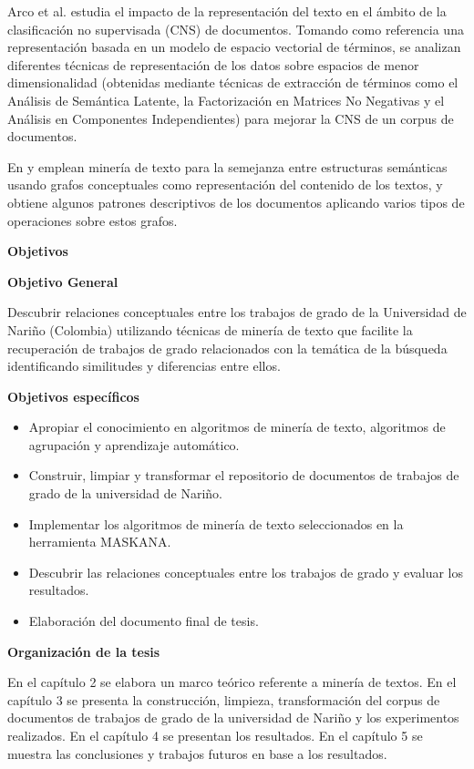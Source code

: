 Arco et al.\cite{arco2006agrupamiento} estudia el impacto de la representación del texto en el ámbito de la clasificación no supervisada (CNS) de documentos.
Tomando como referencia una representación basada en un modelo de espacio vectorial de términos, se analizan diferentes
técnicas de representación de los datos sobre espacios de menor dimensionalidad (obtenidas mediante técnicas de extracción de
términos como el Análisis de Semántica Latente, la Factorización en Matrices No Negativas y el Análisis en Componentes Independientes)
para mejorar la CNS de un corpus de documentos.


En \cite{MONTESYGOMEZ2005} y \cite{munozutilizacion} emplean minería de texto para la semejanza entre estructuras semánticas
usando grafos conceptuales como representación del contenido de los textos, y obtiene algunos patrones descriptivos de los documentos aplicando varios tipos de operaciones sobre estos grafos.



\textbf{Objetivos}
 

\textbf{Objetivo General}

Descubrir relaciones conceptuales entre los trabajos de grado de la Universidad de Nariño (Colombia)
utilizando técnicas de minería de texto que facilite la recuperación de trabajos de grado
relacionados con la temática de la búsqueda identificando  similitudes y diferencias  entre ellos.

\textbf{Objetivos específicos}
\begin{itemize}
\item Apropiar el conocimiento en algoritmos de minería de texto, algoritmos de agrupación  y aprendizaje automático.
\item Construir, limpiar y transformar  el repositorio de documentos de trabajos de grado de la universidad de Nariño.
\item Implementar los algoritmos de minería de texto seleccionados en la herramienta MASKANA.
\item Descubrir las relaciones conceptuales entre los trabajos de grado y evaluar los resultados.
\item Elaboración del documento final de tesis.
\end{itemize}

\textbf{Organización de la tesis}

En el capítulo 2 se elabora un marco teórico referente a minería de textos. 
En el capítulo 3 se presenta la construcción, limpieza, transformación del corpus de documentos de
trabajos de grado de la universidad de Nariño y los experimentos realizados. 
En el capítulo 4 se presentan los resultados.
En el capítulo 5 se muestra las conclusiones y trabajos futuros en base a los resultados.